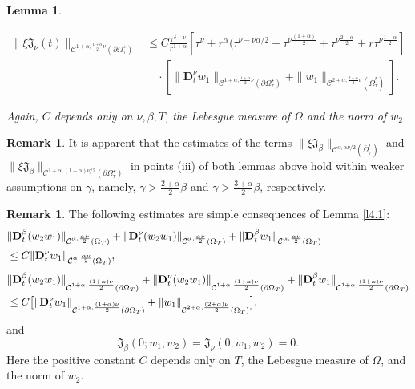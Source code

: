 \documentclass[reqno]{amsart}
\def\C {\mathcal{C}}
\newtheorem{lemma}[proposition]{Lemma}
\theoremstyle{definition}
\newtheorem{remark}[proposition]{Remark}
\numberwithin{equation}{section}
\begin{document}
\begin{lemma}
\begin{description}
\begin{align*}
		\|\xi\mathfrak{J}_{\nu}(t)\|_{\C^{1+\alpha,\frac{1+\alpha}{2}\nu}(\partial\Omega^{\star}_{\tau})}&\leq C
		\frac{\tau^{\delta-\nu}}{r^{1+\alpha}}[\tau^{\nu}+r^{\alpha}(\tau^{\nu-\nu\alpha/2}+\tau^{\nu\frac{(1+\alpha)}{2}}+\tau^{\nu\frac{2-\alpha}{2}}+r\tau^{\nu\frac{1-\alpha}{2}}]\\
		&
		\quad\cdot
		[\|\mathbf{D}_{t}^{\nu}w_1\|_{\C^{1+\alpha,\frac{1+\alpha}{2}\nu}(\partial\Omega^{\star}_{\tau})}+\|w_1\|_{\C^{2+\alpha,\frac{2+\alpha}{2}\nu}(\bar{\Omega}^{r}_{\tau})}].
		\end{align*}
		\end{description}
Again, $C$ depends only on $\nu,\beta,T$, the Lebesgue measure of $\Omega$ and the norm of $w_2$.
\end{lemma}


\begin{remark}\label{r4.3}
It is apparent that the estimates of the terms $\|\xi\mathfrak{J}_{\beta}\|_{\C^{\alpha,\alpha\nu/2}(\bar{\Omega}_{\tau}^{r})}$ and
$\|\xi\mathfrak{J}_{\beta}\|_{\C^{1+\alpha,(1+\alpha)\nu/2}(\partial\Omega^{\star}_{\tau})}$ in points (iii)
of both lemmas above hold within weaker assumptions on $\gamma$, namely, $\gamma>\frac{2+\alpha}{2}\beta$
and $\gamma>\frac{3+\alpha}{2}\beta$, respectively.
\end{remark}

\begin{remark}\label{r4.1}
The following estimates are simple consequences of Lemma \ref{l4.1}:
\begin{align*}
&\|\mathbf{D}_{t}^{\beta}(w_2 w_{1})\|_{\C^{\alpha,\frac{\alpha\nu}{2}}(\bar{\Omega}_{T})}+\|\mathbf{D}_{t}^{\nu}(w_2w_{1})\|_{\C^{\alpha,\frac{\alpha\nu}{2}}(\bar{\Omega}_{T})}+\|\mathbf{D}_{t}^{\beta}w_{1}\|_{\C^{\alpha,\frac{\alpha\nu}{2}}(\bar{\Omega}_{T})}
\\&\leq C \|\mathbf{D}_{t}^{\nu}w_{1}\|_{\C^{\alpha,\frac{\alpha\nu}{2}}(\bar{\Omega}_{T})},\\
\noalign{\vskip1mm}
&\|\mathbf{D}_{t}^{\beta}(w_2 w_{1})\|_{\C^{1+\alpha,\frac{(1+\alpha)\nu}{2}}(\partial\Omega_{T})}+
\|\mathbf{D}_{t}^{\nu}(w_2 w_{1})\|_{\C^{1+\alpha,\frac{(1+\alpha)\nu}{2}}(\partial\Omega_{T})}
+\|\mathbf{D}_{t}^{\beta}w_{1}\|_{\C^{1+\alpha,\frac{(1+\alpha)\nu}{2}}(\partial\Omega_{T})}\\&\leq C
\big[ \|\mathbf{D}_{t}^{\nu}w_{1}\|_{\C^{1+\alpha,\frac{(1+\alpha)\nu}{2}}(\partial\Omega_{T})}
+\|w_{1}\|_{\C^{2+\alpha,\frac{(2+\alpha)\nu}{2}}(\bar{\Omega}_{T})}
\big],
\end{align*}
and
$$\mathfrak{J}_{\beta}(0;w_1,w_2)=\mathfrak{J}_{\nu}(0;w_1,w_2)=0.$$
Here the positive constant $C$ depends only on  $T$, the Lebesgue measure of $\Omega$, and the norm of $w_2$.
\end{remark}
\end{document}
